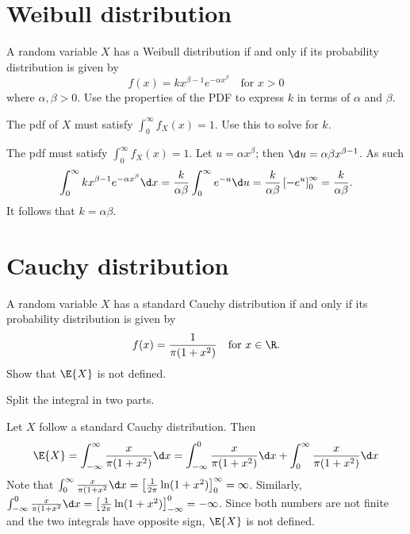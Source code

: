 \section{Weibull distribution}
\label{sec:section-5.2}

	\begin{exercise}
		A random variable $X$ has a Weibull distribution if and only if its probability distribution is given by
		\begin{equation}
			f(x) = kx^{\beta - 1} e^{- \alpha x^{\beta}} \quad \text{for } x > 0
		\end{equation}
		where $\alpha, \beta > 0$. Use the properties of the PDF to express $k$ in terms of $\alpha$ and $\beta$.
		\begin{hint}
			The pdf of $X$ must satisfy $\int_0^{\infty} f_X(x) = 1$. Use this to solve for $k$.
		\end{hint}
		\begin{solution}
			The pdf must satisfy $\int_0^{\infty} f_X(x) = 1$. Let $u = \alpha x^{\beta}$; then $\d u = \alpha \beta x^{\beta - 1}$. As such
			\begin{align*}
				\int_0^{\infty} k x^{\beta - 1} e^{- \alpha x^{\beta}} \d x = \frac{k}{\alpha \beta} \int_0^{\infty} e^{-u} \d u = \frac{k}{\alpha \beta} \left[-e^u\right]_0^{\infty} = \frac{k}{\alpha \beta}.
			\end{align*}
			It follows that $k = \alpha \beta$.
		\end{solution}
	\end{exercise}

\section{Cauchy distribution}
\label{sec:section-5.3}
	
	\begin{exercise}\label{ex:chap05:04}
		A random variable $X$ has a standard Cauchy distribution if and only if its probability distribution is given by
		\begin{equation}
			f(x) = \frac{1}{\pi (1 + x^2)} \quad \text{for } x \in \R.
		\end{equation}
		Show that $\E{X}$ is not defined.
		\begin{hint}
			Split the integral in two parts.	
		\end{hint}

		\begin{solution}
			Let $X$ follow a standard Cauchy distribution. Then
			\begin{align*}
				\E{X} = \int_{-\infty}^{\infty} \frac{x}{\pi (1 + x^2)} \d x = \int_{-\infty}^0 \frac{x}{\pi (1 + x^2)} \d x + \int_0^{\infty} \frac{x}{\pi (1 + x^2)} \d x
			\end{align*}
			Note that $\int_0^{\infty} \frac{x}{\pi (1 + x^2} \d x = \left[\frac{1}{2 \pi} \ln(1 + x^2)\right]_0^{\infty} = \infty$. Similarly, $\int_{-\infty}^0 \frac{x}{\pi (1 + x^2} \d x = \left[\frac{1}{2 \pi} \ln(1 + x^2)\right]_{-\infty}^0 = - \infty$. Since both numbers are not finite and the two integrals have opposite sign, $\E{X}$ is not defined.
		\end{solution}
	\end{exercise}

